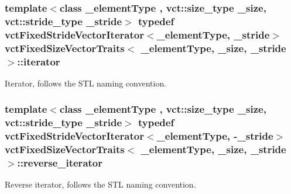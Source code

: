\subsubsection[{iterator}]{\setlength{\rightskip}{0pt plus 5cm}template$<$class \+\_\+element\+Type , vct\+::size\+\_\+type \+\_\+size, vct\+::stride\+\_\+type \+\_\+stride$>$ typedef {\bf vct\+Fixed\+Stride\+Vector\+Iterator}$<$\+\_\+element\+Type, \+\_\+stride$>$ {\bf vct\+Fixed\+Size\+Vector\+Traits}$<$ \+\_\+element\+Type, \+\_\+size, \+\_\+stride $>$\+::{\bf iterator}}\label{classvct_fixed_size_vector_traits_a4c4cff693ac7f81edfb240a208506309}
Iterator, follows the S\+T\+L naming convention. \hypertarget{classvct_fixed_size_vector_traits_a46a61657ee7bece7277e0b59c4e0ea41}{}
\subsubsection[{reverse\+\_\+iterator}]{\setlength{\rightskip}{0pt plus 5cm}template$<$class \+\_\+element\+Type , vct\+::size\+\_\+type \+\_\+size, vct\+::stride\+\_\+type \+\_\+stride$>$ typedef {\bf vct\+Fixed\+Stride\+Vector\+Iterator}$<$\+\_\+element\+Type, -\/\+\_\+stride$>$ {\bf vct\+Fixed\+Size\+Vector\+Traits}$<$ \+\_\+element\+Type, \+\_\+size, \+\_\+stride $>$\+::{\bf reverse\+\_\+iterator}}\label{classvct_fixed_size_vector_traits_a46a61657ee7bece7277e0b59c4e0ea41}
Reverse iterator, follows the S\+T\+L naming convention. 

